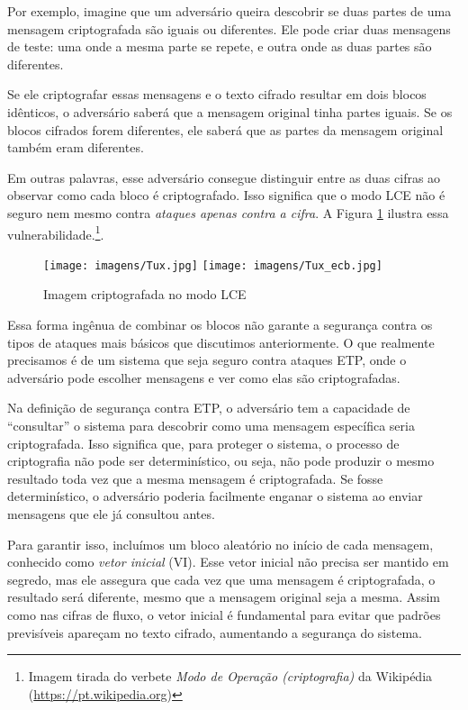 Por exemplo, imagine que um adversário queira descobrir se duas partes de uma mensagem criptografada são iguais ou diferentes.
Ele pode criar duas mensagens de teste:
uma onde a mesma parte se repete, e outra onde as duas partes são diferentes.

Se ele criptografar essas mensagens e o texto cifrado resultar em dois blocos idênticos, o adversário saberá que a mensagem original tinha partes iguais.
Se os blocos cifrados forem diferentes, ele saberá que as partes da mensagem original também eram diferentes.

Em outras palavras, esse adversário consegue distinguir entre as duas cifras ao observar como cada bloco é criptografado.
Isso significa que o modo LCE não é seguro nem mesmo contra {\em ataques apenas contra a cifra}.
A Figura \ref{fig:ecb-exemplo} ilustra essa vulnerabilidade.\footnote{Imagem tirada do verbete {\em Modo de Operação (criptografia)} da Wikipédia (\url{https://pt.wikipedia.org})}.

\begin{figure}[!htp]
  \label{fig:ecb-exemplo}
  \centering
  \texttt{[image: imagens/Tux.jpg]}
  \texttt{[image: imagens/Tux\_ecb.jpg]}
  \caption{Imagem criptografada no modo LCE}
\end{figure}

Essa forma ingênua de combinar os blocos não garante a segurança contra os tipos de ataques mais básicos que discutimos anteriormente.
O que realmente precisamos é de um sistema que seja seguro contra ataques ETP, onde o adversário pode escolher mensagens e ver como elas são criptografadas.

Na definição de segurança contra ETP, o adversário tem a capacidade de ``consultar'' o sistema para descobrir como uma mensagem específica seria criptografada.
Isso significa que, para proteger o sistema, o processo de criptografia não pode ser determinístico, ou seja, não pode produzir o mesmo resultado toda vez que a mesma mensagem é criptografada.
Se fosse determinístico, o adversário poderia facilmente enganar o sistema ao enviar mensagens que ele já consultou antes.

Para garantir isso, incluímos um bloco aleatório no início de cada mensagem, conhecido como {\em vetor inicial} (VI).
Esse vetor inicial não precisa ser mantido em segredo, mas ele assegura que cada vez que uma mensagem é criptografada, o resultado será diferente, mesmo que a mensagem original seja a mesma.
Assim como nas cifras de fluxo, o vetor inicial é fundamental para evitar que padrões previsíveis apareçam no texto cifrado, aumentando a segurança do sistema.

